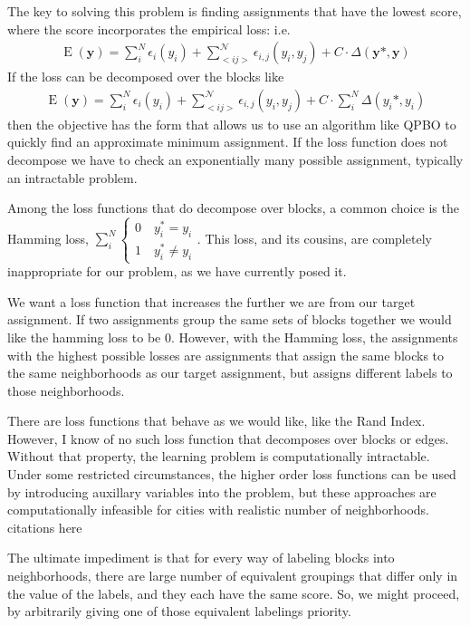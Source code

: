 The key to solving this problem is finding assignments that have the
lowest score, where the score incorporates the empirical loss: i.e.
%
\begin{align}
\operatorname{E}(\mathbf{y}) = \sum_i^N\epsilon_i(y_i) + \sum_{<i
  j>}^{\mathcal{N}}\epsilon_{i,j}(y_i,y_j) + C\cdot\Delta(\mathbf{y}*, \mathbf{y})
\end{align}
%
If the loss can be decomposed over the blocks like
%
\begin{align}
\operatorname{E}(\mathbf{y}) = \sum_i^N\epsilon_i(y_i) + \sum_{<i
  j>}^{\mathcal{N}}\epsilon_{i,j}(y_i,y_j) + C\cdot\sum_i^N\Delta(y_i*, y_i)
\end{align}
%
then the objective has the form that allows us to use an algorithm
like QPBO to quickly find an approximate minimum assignment. If the
loss function does not decompose we have to check an exponentially
many possible assignment, typically an intractable problem.

Among the loss functions that do decompose over blocks, a common
choice is the Hamming loss, $\sum_i^N\begin{cases}
  0 \quad y_i^* = y_i \\
  1 \quad y_i^* \neq y_i
\end{cases}$. This loss, and its cousins, are completely inappropriate
for our problem, as we have currently posed it.

We want a loss function that increases the further we are from our
target assignment. If two assignments group the same sets of blocks
together we would like the hamming loss to be 0. However, with the
Hamming loss, the assignments with the highest possible
losses are assignments that assign the same blocks to the same
neighborhoods as our target assignment, but assigns different labels
to those neighborhoods. 

There are loss functions that behave as we would like, like the Rand
Index. However, I know of no such loss function that decomposes over
blocks or edges. Without that property, the learning problem is
computationally intractable. Under some restricted circumstances, the
higher order loss functions can be used by introducing auxillary
variables into the problem, but these approaches are computationally
infeasible for cities with realistic number of
neighborhoods. {citations here}

The ultimate impediment is that for every way of labeling blocks into
neighborhoods, there are large number of equivalent groupings that
differ only in the value of the labels, and they each have the same
score. So, we might proceed, by arbitrarily giving one of those
equivalent labelings priority.

